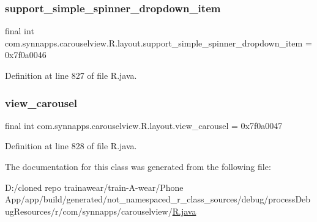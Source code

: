 \subsubsection{\texorpdfstring{support\_simple\_spinner\_dropdown\_item}{support\_simple\_spinner\_dropdown\_item}}
{\footnotesize\ttfamily final int com.\+synnapps.\+carouselview.\+R.\+layout.\+support\+\_\+simple\+\_\+spinner\+\_\+dropdown\+\_\+item = 0x7f0a0046\hspace{0.3cm}{\ttfamily [static]}}



Definition at line 827 of file R.\+java.

\mbox{\label{classcom_1_1synnapps_1_1carouselview_1_1_r_1_1layout_a6d9537890b32e70686d76cdbb4712975}} 
\subsubsection{\texorpdfstring{view\_carousel}{view\_carousel}}
{\footnotesize\ttfamily final int com.\+synnapps.\+carouselview.\+R.\+layout.\+view\+\_\+carousel = 0x7f0a0047\hspace{0.3cm}{\ttfamily [static]}}



Definition at line 828 of file R.\+java.



The documentation for this class was generated from the following file\+:\begin{DoxyCompactItemize}
\item 
D\+:/cloned repo trainawear/train-\/\+A-\/wear/\+Phone App/app/build/generated/not\+\_\+namespaced\+\_\+r\+\_\+class\+\_\+sources/debug/process\+Debug\+Resources/r/com/synnapps/carouselview/\mbox{\hyperlink{process_debug_resources_2r_2com_2synnapps_2carouselview_2_r_8java}{R.\+java}}\end{DoxyCompactItemize}
